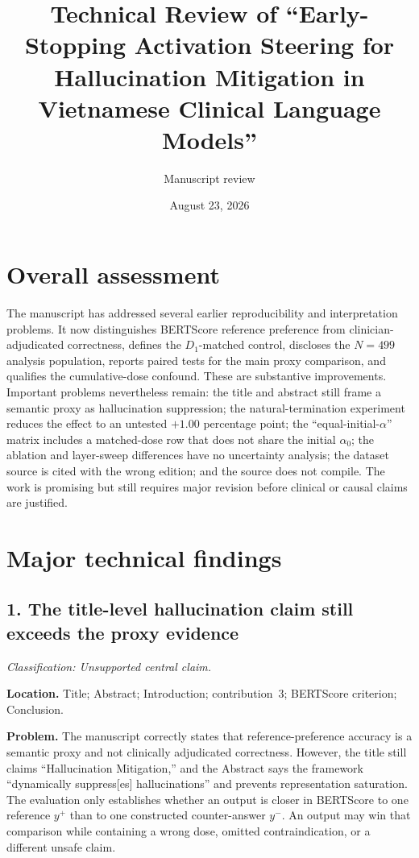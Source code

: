 \documentclass[11pt]{article}
\title{Technical Review of ``Early-Stopping Activation Steering for Hallucination Mitigation in Vietnamese Clinical Language Models''}
\author{Manuscript review}
\date{August 23, 2026}
\newcommand{\findinglabel}[1]{\textbf{#1}}
\newcommand{\classification}[1]{\textit{Classification: #1.}}
\begin{document}
\maketitle

\section*{Overall assessment}

The manuscript has addressed several earlier reproducibility and interpretation problems.  It now distinguishes BERTScore reference preference from clinician-adjudicated correctness, defines the $D_1$-matched control, discloses the $N=499$ analysis population, reports paired tests for the main proxy comparison, and qualifies the cumulative-dose confound.  These are substantive improvements.  Important problems nevertheless remain: the title and abstract still frame a semantic proxy as hallucination suppression; the natural-termination experiment reduces the effect to an untested $+1.00$ percentage point; the ``equal-initial-$\alpha$'' matrix includes a matched-dose row that does not share the initial $\alpha_0$; the ablation and layer-sweep differences have no uncertainty analysis; the dataset source is cited with the wrong edition; and the source does not compile.  The work is promising but still requires major revision before clinical or causal claims are justified.

\section*{Major technical findings}

\subsection*{1. The title-level hallucination claim still exceeds the proxy evidence}

\classification{Unsupported central claim}

\findinglabel{Location.} Title; Abstract; Introduction; contribution~3; BERTScore criterion; Conclusion.

\findinglabel{Problem.} The manuscript correctly states that reference-preference accuracy is a semantic proxy and not clinically adjudicated correctness.  However, the title still claims ``Hallucination Mitigation,'' and the Abstract says the framework ``dynamically suppress[es] hallucinations'' and prevents representation saturation.  The evaluation only establishes whether an output is closer in BERTScore to one reference $y^+$ than to one constructed counter-answer $y^-$.  An output may win that comparison while containing a wrong dose, omitted contraindication, or a different unsafe claim.
\end{document}
